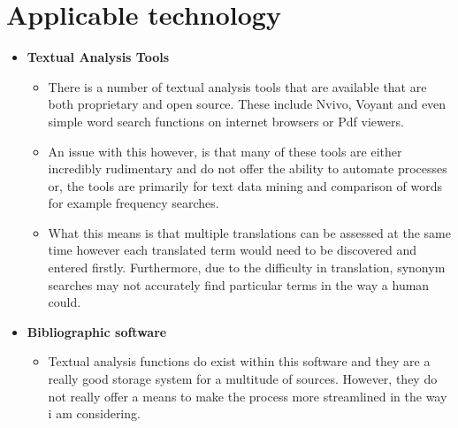 \documentclass{article}
\begin{document}
\section{Applicable technology}


\begin{itemize}

\item{\textbf{Textual Analysis Tools}}
\begin{itemize}
\item{There is a number of textual analysis tools that are available that are both proprietary and open source. These include Nvivo, Voyant and even simple word search functions on internet browsers or Pdf viewers.}
\item{An issue with this however, is that many of these tools are either incredibly rudimentary and do not offer the ability to automate processes or, the tools are primarily for text data mining and comparison of words for example frequency searches.}
\item{What this means is that multiple translations can be assessed at the same time however each translated term would need to be discovered and entered firstly. Furthermore, due to the difficulty in translation, synonym searches may not accurately find particular terms in the way a human could.}

\end{itemize}
\item{\textbf{Bibliographic software}}
\begin{itemize}
\item{Textual analysis functions do exist within this software and they are a really good storage system for a multitude of sources. However, they do not really offer a means to make the process more streamlined in the way i am considering.} 
\end{itemize}

\end{itemize}
\end{document}
